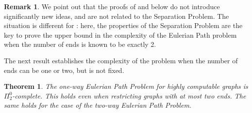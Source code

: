 \documentclass[10pt,A4]{amsart}
\newtheorem{thm}{Theorem}[section]
\theoremstyle{definition}
\theoremstyle{definition}
\newtheorem{remark}{Remark}
\begin{document}


\begin{remark}
We point out that the proofs of  and  below do not introduce significantly new ideas, and are not related to the Separation Problem.  The situation is different for : here, the properties of the Separation Problem are the key to prove the upper bound in the complexity of the Eulerian Path problem when the number of ends is known to be exactly 2.
\end{remark}
The next result establishes the complexity of the problem when the number of ends can be one or two, but is not fixed.
\begin{thm}\label{thm:eulerian-path-general}
The one-way Eulerian Path Problem for highly computable graphs is $\Pi_2^0$-complete. This holds even when restricting graphs with at most two ends. The same holds for the case of the two-way Eulerian Path Problem.
\end{thm} 
\end{document}
